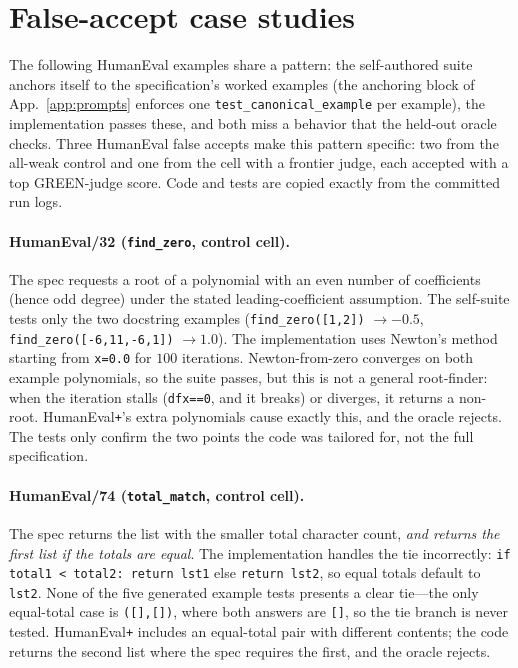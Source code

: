\section{False-accept case studies}
\label{app:cases}

The following HumanEval examples share a pattern: the self-authored suite anchors itself to the
specification's worked examples (the anchoring block of App.~\ref{app:prompts} enforces one
\texttt{test\_canonical\_example} per example), the implementation passes these, and both miss
a behavior that the held-out oracle checks. Three HumanEval false accepts make this pattern
specific: two from the all-weak control and one from the cell with a frontier judge, each accepted
with a top GREEN-judge score. Code and tests are copied exactly from the committed run logs.

\paragraph{HumanEval/32 (\texttt{find\_zero}, control cell).} The spec requests a root of
a polynomial with an even number of coefficients (hence odd degree) under the stated
leading-coefficient assumption. The self-suite tests only the two docstring examples
(\texttt{find\_zero([1,2])} $\rightarrow -0.5$, \texttt{find\_zero([-6,11,-6,1])} $\rightarrow
1.0$). The implementation uses Newton's method starting from \texttt{x=0.0} for $100$
iterations. Newton-from-zero converges on both example polynomials, so the suite passes, but this
is not a general root-finder: when the iteration stalls (\texttt{dfx==0}, and it breaks) or
diverges, it returns a non-root. HumanEval\texttt{+}'s extra polynomials cause exactly
this, and the oracle rejects. The tests only confirm the two points the code was tailored for, not
the full specification.

\paragraph{HumanEval/74 (\texttt{total\_match}, control cell).} The spec returns the list with
the smaller total character count, \emph{and returns the first list if the totals are equal}.
The implementation handles the tie incorrectly: \texttt{if total1 < total2: return lst1} else
\texttt{return lst2}, so equal totals default to \texttt{lst2}. None of the five generated
example tests presents a clear tie---the only equal-total case is \texttt{([],[])}, where
both answers are \texttt{[]}, so the tie branch is never tested. HumanEval\texttt{+} includes
an equal-total pair with different contents; the code returns the second list where the spec
requires the first, and the oracle rejects.

